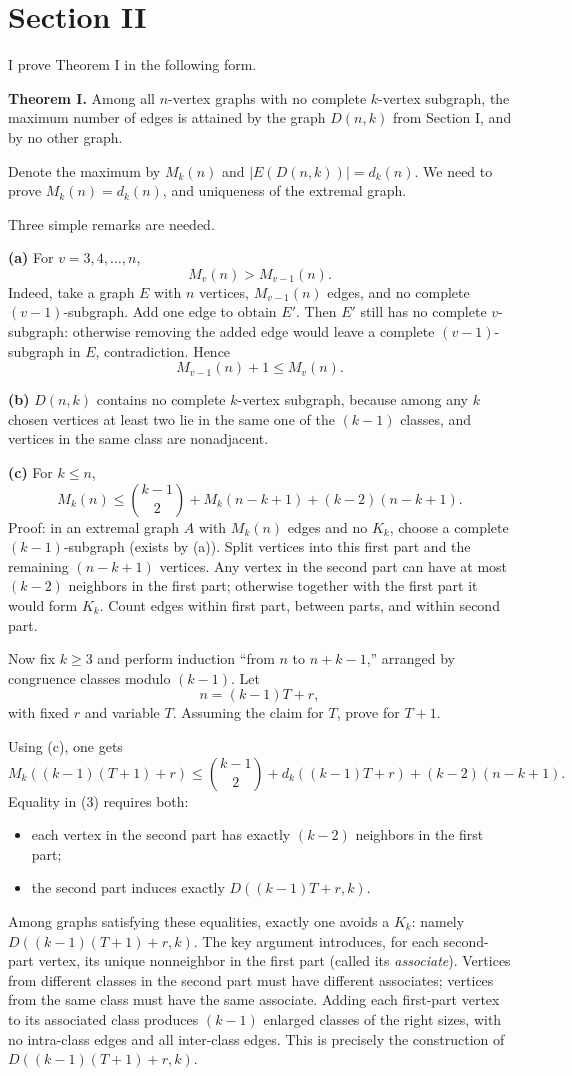 \documentclass[11pt]{article}
\begin{document}
\section*{Section II}
I prove Theorem I in the following form.

\textbf{Theorem I.}
Among all $n$-vertex graphs with no complete $k$-vertex subgraph, the maximum number of edges is attained by the graph $D(n,k)$ from Section I, and by no other graph.

Denote the maximum by $M_k(n)$ and $|E(D(n,k))|=d_k(n)$. We need to prove $M_k(n)=d_k(n)$, and uniqueness of the extremal graph.

Three simple remarks are needed.

\textbf{(a)} For $v=3,4,\dots,n$,
\[
M_v(n)>M_{v-1}(n).
\]
Indeed, take a graph $E$ with $n$ vertices, $M_{v-1}(n)$ edges, and no complete $(v-1)$-subgraph. Add one edge to obtain $E'$. Then $E'$ still has no complete $v$-subgraph: otherwise removing the added edge would leave a complete $(v-1)$-subgraph in $E$, contradiction. Hence
\[
M_{v-1}(n)+1\le M_v(n).
\]

\textbf{(b)} $D(n,k)$ contains no complete $k$-vertex subgraph, because among any $k$ chosen vertices at least two lie in the same one of the $(k-1)$ classes, and vertices in the same class are nonadjacent.

\textbf{(c)} For $k\le n$,
\[
M_k(n)\le \binom{k-1}{2}+M_k(n-k+1)+(k-2)(n-k+1).
\]
Proof: in an extremal graph $A$ with $M_k(n)$ edges and no $K_k$, choose a complete $(k-1)$-subgraph (exists by (a)). Split vertices into this first part and the remaining $(n-k+1)$ vertices. Any vertex in the second part can have at most $(k-2)$ neighbors in the first part; otherwise together with the first part it would form $K_k$. Count edges within first part, between parts, and within second part.

Now fix $k\ge3$ and perform induction ``from $n$ to $n+k-1$,'' arranged by congruence classes modulo $(k-1)$. Let
\[
n=(k-1)T+r,
\]
with fixed $r$ and variable $T$. Assuming the claim for $T$, prove for $T+1$.

Using (c), one gets
\[
M_k((k-1)(T+1)+r)
\le \binom{k-1}{2}+d_k((k-1)T+r)+(k-2)(n-k+1). \tag{3}
\]
Equality in (3) requires both:
\begin{itemize}
\item each vertex in the second part has exactly $(k-2)$ neighbors in the first part;
\item the second part induces exactly $D((k-1)T+r,k)$.
\end{itemize}
Among graphs satisfying these equalities, exactly one avoids a $K_k$: namely $D((k-1)(T+1)+r,k)$. The key argument introduces, for each second-part vertex, its unique nonneighbor in the first part (called its \emph{associate}). Vertices from different classes in the second part must have different associates; vertices from the same class must have the same associate. Adding each first-part vertex to its associated class produces $(k-1)$ enlarged classes of the right sizes, with no intra-class edges and all inter-class edges. This is precisely the construction of $D((k-1)(T+1)+r,k)$.
\end{document}
